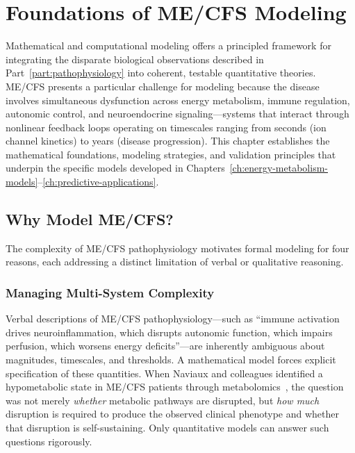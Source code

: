 \chapter{Foundations of ME/CFS Modeling}
\label{ch:modeling-foundations}

Mathematical and computational modeling offers a principled framework for integrating the disparate biological observations described in Part~\ref{part:pathophysiology} into coherent, testable quantitative theories. ME/CFS presents a particular challenge for modeling because the disease involves simultaneous dysfunction across energy metabolism, immune regulation, autonomic control, and neuroendocrine signaling---systems that interact through nonlinear feedback loops operating on timescales ranging from seconds (ion channel kinetics) to years (disease progression). This chapter establishes the mathematical foundations, modeling strategies, and validation principles that underpin the specific models developed in Chapters~\ref{ch:energy-metabolism-models}--\ref{ch:predictive-applications}.



\section{Why Model ME/CFS?}
\label{sec:why-model}

The complexity of ME/CFS pathophysiology motivates formal modeling for four reasons, each addressing a distinct limitation of verbal or qualitative reasoning.

\subsection{Managing Multi-System Complexity}

Verbal descriptions of ME/CFS pathophysiology---such as ``immune activation drives neuroinflammation, which disrupts autonomic function, which impairs perfusion, which worsens energy deficits''---are inherently ambiguous about magnitudes, timescales, and thresholds. A mathematical model forces explicit specification of these quantities. When Naviaux and colleagues identified a hypometabolic state in ME/CFS patients through metabolomics~\cite{Naviaux2016metabolomics}, the question was not merely \emph{whether} metabolic pathways are disrupted, but \emph{how much} disruption is required to produce the observed clinical phenotype and whether that disruption is self-sustaining. Only quantitative models can answer such questions rigorously.

